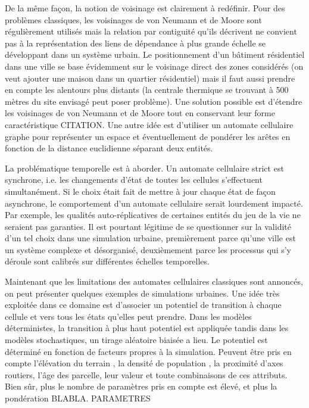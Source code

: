 \documentclass[10pt]{article}
\begin{document}
\begin{multicols}{2}
De la même façon, la notion de voisinage est clairement à
redéfinir. Pour des problèmes classiques, les voisinages de von
Neumann et de Moore sont régulièrement utilisés mais la relation par
contiguité qu'ils décrivent ne convient pas à la représentation des
liens de dépendance à plus grande échelle se développant dans un
système urbain. Le positionnement d'un bâtiment résidentiel dans une
ville se base évidemment sur le voisinage direct des zones considérés
(on veut ajouter une maison dans un quartier résidentiel) mais il faut
aussi prendre en compte les alentours plus distants (la centrale
thermique se trouvant à 500 mètres du site envisagé peut poser
problème). Une solution possible est d'étendre les voisinages de von
Neumann et de Moore tout en conservant leur forme caractéristique
CITATION. Une autre idée est d'utiliser un automate cellulaire graphe
pour représenter un espace \cite{0'Sullivan2001} et éventuellement de
pondérer les arêtes en fonction de la distance euclidienne séparant
deux entités.

La problématique temporelle est à aborder. Un automate cellulaire
strict est synchrone, i.e. les changements d'état de toutes les
cellules s'effectuent simultanément. Si le choix était fait de mettre
à jour chaque état de façon asynchrone, le comportement d'un automate
cellulaire serait lourdement impacté. Par exemple, les qualités
auto-réplicatives de certaines entités du jeu de la vie ne seraient
pas garanties. Il est pourtant légitime de se questionner sur la
validité d'un tel choix dans une simulation urbaine, premièrement
parce qu'une ville est un système complexe et désorganisé,
deuxièmement parce les processus qui s'y déroule sont calibrés sur
différentes échelles temporelles.

Maintenant que les limitations des automates cellulaires classiques
sont annoncés, on peut présenter quelques exemples de simulations
urbaines. Une idée très exploitée dans ce domaine est d'associer un
potentiel de transition à chaque cellule et vers tous les états
qu'elles peut prendre. Dans les modèles déterministes, la transition à
plus haut potentiel est appliquée tandis dans les modèles
stochastiques, un tirage aléatoire biaisée a lieu. Le potentiel est
déterminé en fonction de facteurs propres à la simulation. Peuvent
être pris en compte l'élévation du terrain \cite{Semboloni2000}, la
densité de population \cite{}, la proximité d'axes routiers, l'âge des
parcelle, leur valeur et toute combinaisons de ces attributs. Bien
sûr, plus le nombre de paramètres pris en compte est élevé, et plus la
pondération BLABLA. PARAMETRES


\end{multicols}
\end{document}

